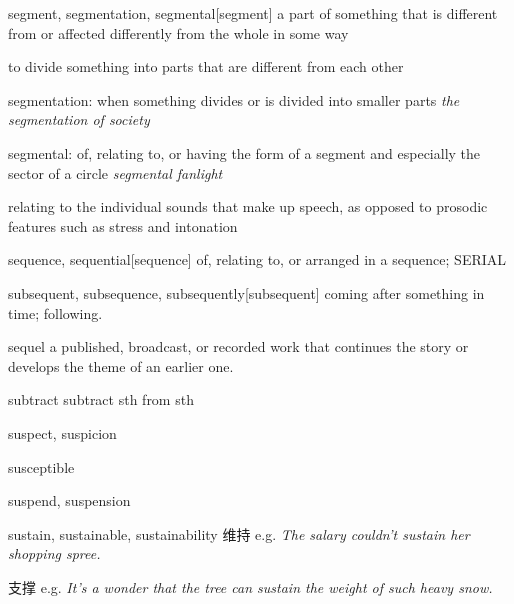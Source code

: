 \begin{word}{segment, segmentation, segmental}[segment]
    a part of something that is different from or affected differently from the whole in some way

    to divide something into parts that are different from each other

    segmentation: when something divides or is divided into smaller parts
    \textit{the segmentation of society}

    segmental: of, relating to, or having the form of a segment and especially the sector of a circle
    \textit{segmental fanlight}

    relating to the individual sounds that make up speech, as opposed to prosodic features such as stress and intonation
\end{word}

\begin{word}{sequence, sequential}[sequence]
    of, relating to, or arranged in a sequence; SERIAL
\end{word}

\begin{word}{subsequent, subsequence, subsequently}[subsequent]
    coming after something in time; following.
\end{word}

\begin{word}{sequel}
    a published, broadcast, or recorded work that continues the story or develops the theme of an earlier one.
\end{word}

\begin{word}{subtract}
    subtract sth from sth
\end{word}

\begin{word}{suspect, suspicion}
\end{word}

\begin{word}{susceptible}
\end{word}

\begin{word}{suspend, suspension}
\end{word}

\begin{word}{sustain, sustainable, sustainability}
    维持
    e.g. \textit{The salary couldn't sustain her shopping spree.}
    
    支撑
    e.g. \textit{It's a wonder that the tree can sustain the weight of such heavy snow.}
    
\end{word}
